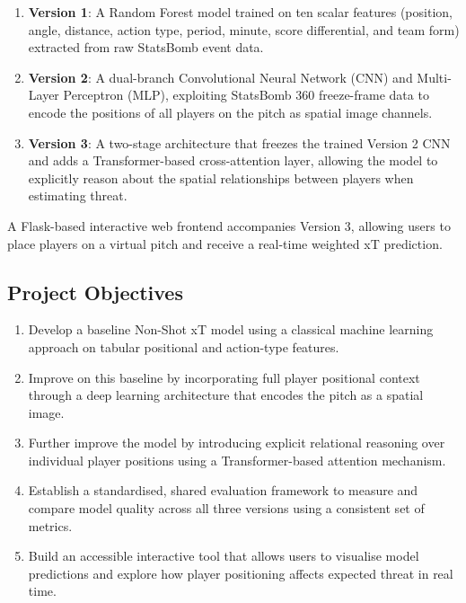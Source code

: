 \documentclass{article}
\begin{document}
\begin{enumerate}
    \item \textbf{Version 1}: A Random Forest model trained on ten scalar features (position, angle, distance, action type, period, minute, score differential, and team form) extracted from raw StatsBomb event data.
    \item \textbf{Version 2}: A dual-branch Convolutional Neural Network (CNN) and Multi-Layer Perceptron (MLP), exploiting StatsBomb 360 freeze-frame data to encode the positions of all players on the pitch as spatial image channels.
    \item \textbf{Version 3}: A two-stage architecture that freezes the trained Version 2 CNN and adds a Transformer-based cross-attention layer, allowing the model to explicitly reason about the spatial relationships between players when estimating threat.
\end{enumerate}

A Flask-based interactive web frontend accompanies Version 3, allowing users to place players on a virtual pitch and receive a real-time weighted xT prediction.

\subsection{Project Objectives}
\begin{enumerate}
    \item Develop a baseline Non-Shot xT model using a classical machine learning approach on tabular positional and action-type features.
    \item Improve on this baseline by incorporating full player positional context through a deep learning architecture that encodes the pitch as a spatial image.
    \item Further improve the model by introducing explicit relational reasoning over individual player positions using a Transformer-based attention mechanism.
    \item Establish a standardised, shared evaluation framework to measure and compare model quality across all three versions using a consistent set of metrics.
    \item Build an accessible interactive tool that allows users to visualise model predictions and explore how player positioning affects expected threat in real time.
\end{enumerate}
\end{document}
